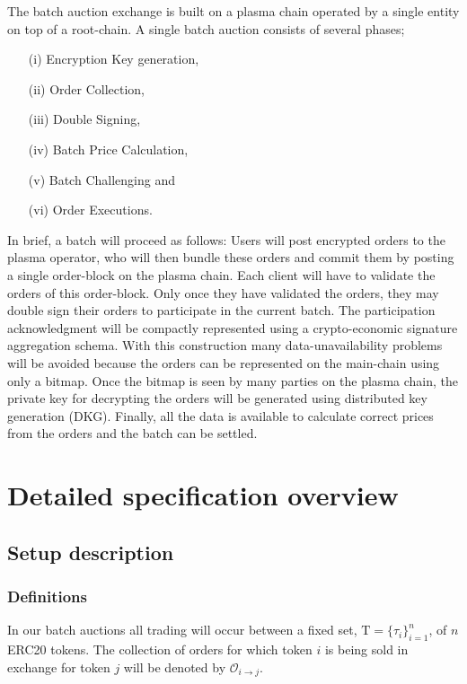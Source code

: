 \documentclass[11pt,parskip=full]{scrartcl}%
\newcommand{\Tau}{\mathrm{T}}
\def\pO{\mathcal{O}}
\def\ra{\rightarrow}
\newcommand*{\erc}{ERC20 }
\begin{document}
The batch auction exchange is built on a plasma chain operated by a single entity on top of a root-chain. A single batch auction consists of several phases;
\begin{itemize}
\item[(i)] Encryption Key generation, 
\item[(ii)] Order Collection, 
\item[(iii)] Double Signing, 
\item[(iv)] Batch Price Calculation, 
\item[(v)] Batch Challenging and 
\item[(vi)] Order Executions. 
\end{itemize}
In brief, a batch will proceed as follows: Users will post encrypted orders to the plasma operator, who will then bundle these orders and commit them by posting a single order-block on the plasma chain. Each client will have to validate the orders of this order-block. Only once they have validated the orders, they may double sign their orders to participate in the current batch. The participation acknowledgment will be compactly represented using a crypto-economic signature aggregation schema. With this construction many data-unavailability problems will be avoided because the orders can be represented on the main-chain using only a bitmap.
Once the bitmap is seen by many parties on the plasma chain, the private key for decrypting the orders will be generated using distributed key generation (DKG). Finally, all the data is available to calculate correct prices from the orders and the batch can be settled. 


\newpage

\section{Detailed specification overview}
\subsection{Setup description}

\subsubsection{Definitions}


In our batch auctions all trading will occur between a fixed set, $\Tau = \{\tau_i\}_{i=1}^n$, of $n$ \erc tokens. The collection of orders for which token $i$ is being sold in exchange for token $j$ will be denoted by $\pO_{i\ra j}$. 
\end{document}
